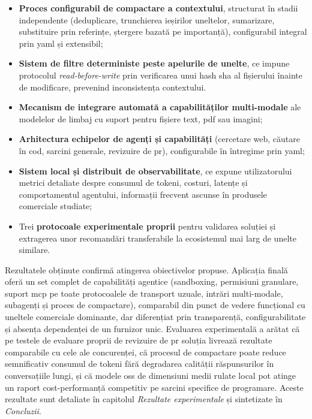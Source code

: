 \documentclass[12pt, a4paper, oneside, romanian]{teza-upb}
\begin{document}
  \begin{itemize}
    \item \textbf{Proces configurabil de compactare a contextului}, structurat în stadii independente (deduplicare,
      trunchierea ieșirilor uneltelor, sumarizare, substituire prin referințe, ștergere bazată pe importanță), configurabil
      integral prin \ac{yaml} și extensibil;
    \item \textbf{Sistem de filtre deterministe peste apelurile de unelte}, ce impune protocolul \emph{read-before-write}
      prin verificarea unui hash \ac{sha} al fișierului înainte de modificare, prevenind inconsistența contextului.
    \item \textbf{Mecanism de integrare automată a capabilităților multi-modale} ale modelelor de limbaj cu suport pentru fișiere text, \ac{pdf} sau imagini;
    \item \textbf{Arhitectura echipelor de agenți și capabilități} (cercetare web, căutare în cod, sarcini generale, revizuire de \ac{pr}),
      configurabile în întregime prin \ac{yaml};
    \item \textbf{Sistem local și distribuit de observabilitate}, ce expune utilizatorului metrici detaliate despre consumul de tokeni,
      costuri, latențe și comportamentul agentului, informații frecvent ascunse în produsele comerciale studiate;
    \item Trei \textbf{protocoale experimentale proprii} pentru validarea soluției și extragerea unor recomandări
      transferabile la ecosistemul mai larg de unelte similare.
  \end{itemize}

  \newpage

  Rezultatele obținute confirmă atingerea obiectivelor propuse. Aplicația finală oferă un set complet de capabilități agentice
  (sandboxing, permisiuni granulare, suport \ac{mcp} pe toate protocoalele de transport uzuale, intrări multi-modale,
  subagenți și proces de compactare), comparabil din punct de vedere funcțional cu uneltele comerciale dominante, dar
  diferențiat prin transparență, configurabilitate și absența dependenței de un furnizor unic. Evaluarea experimentală a
  arătat că pe testele de evaluare proprii de revizuire de \ac{pr} soluția livrează rezultate comparabile cu cele ale concurenței,
  că procesul de compactare poate reduce semnificativ consumul de tokeni fără degradarea calității răspunsurilor în
  conversațiile lungi, și că modele \ac{oss} de dimensiuni medii rulate local pot atinge un raport cost-performanță competitiv
  pe sarcini specifice de programare. Aceste rezultate sunt detaliate în capitolul \emph{Rezultate experimentale} și sintetizate
  în \emph{Concluzii}.
 
\end{document}
